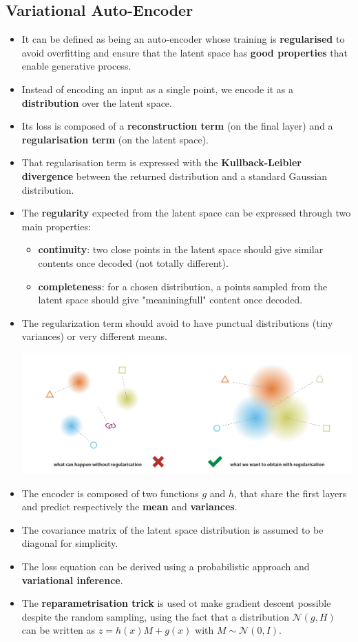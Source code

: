 \subsection{Variational Auto-Encoder}
\begin{itemize}
    \item  It can be defined as being an auto-encoder whose training is \textbf{regularised} to avoid overfitting and ensure that the latent space has \textbf{good properties} that enable generative process.
    \item Instead of encoding an input as a single point, we encode it as a \textbf{distribution} over the latent space.
    \item Its loss is composed of a \textbf{reconstruction term} (on the final layer) and a \textbf{regularisation term} (on the latent space).
    \item That regularisation term is expressed with the \textbf{Kullback-Leibler divergence} between the returned distribution and a standard Gaussian distribution.
    \item The \textbf{regularity} expected from the latent space can be expressed through two main properties:
    \begin{itemize}
        \item \textbf{continuity}: two close points in the latent space should give similar contents once decoded (not totally different).
        \item \textbf{completeness}: for a chosen distribution, a points sampled from the latent space should give "meaniningfull" content once decoded.
    \end{itemize}
    \item The regularization term should avoid to have punctual distributions (tiny variances) or very different means. 
    
    \includegraphics[scale=0.2]{content/latent_space_regularisation.png}

    \item The encoder is composed of two functions $g$ and $h$, that share the first layers and predict respectively the \textbf{mean} and \textbf{variances}.
    \item The covariance matrix of the latent space distribution is assumed to be diagonal for simplicity.
    \item The loss equation can be derived using a probabilistic approach and \textbf{variational inference}.
    \item The \textbf{reparametrisation trick} is used ot make gradient descent possible despite the random sampling, using the fact that a distribution $\mathcal{N}(g, H)$ can be written as $z=h(x)M+g(x)$ with $M\sim\mathcal{N}(0, I)$.


\end{itemize}
